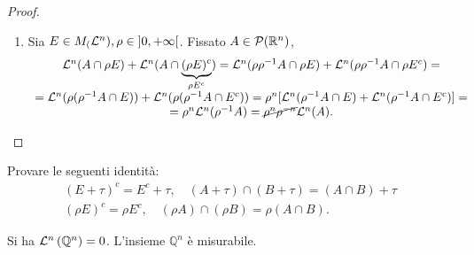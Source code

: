 \begin{proof}
\begin{enumerate}[label=$(\arabic*)$]
\begin{enumerate}
          \item Sia $E\in M_(\mathcal{L}^n), \rho \in\;]0,+\infty[$. Fissato $A\in \mathcal{P}(\mathbb{R}^n)$, 
          \renewcommand{\arraystretch}{1.8}
          \[\begin{array}{c}
              \mathcal{L}^n(A\cap \rho E)+\mathcal{L}^n(A\cap \underbrace{(\rho E)^c}_{\rho E^c}) = \mathcal{L}^n(\rho\rho^{-1}A \cap \rho E)+\mathcal{L}^n(\rho \rho^{-1}A \cap \rho E^c)=\\
              = \mathcal{L}^n (\rho(\rho^{-1}A \cap E))+\mathcal{L}^n(\rho(\rho^{-1}A\cap E^c)) = \rho^n[\mathcal{L}^n(\rho^{-1}A\cap E)+\mathcal{L}^n(\rho^{-1}A\cap E^c)]=\\=\rho^n\mathcal{L}^n(\rho^{-1}A)=\cancel{\rho^n\rho^{-n}}\mathcal{L}^n(A).
          \end{array}\]\qedhere
          \renewcommand{\arraystretch}{1}
      \end{enumerate}
  \end{enumerate}
\end{proof}

\begin{exc} Provare le seguenti identità:
  \[
  \begin{gathered}
  (E+\tau)^{c}=E^{c}+\tau, \quad(A+\tau) \cap(B+\tau)=(A \cap B)+\tau \\
  (\rho E)^{c}=\rho E^{c}, \quad(\rho A) \cap(\rho B)=\rho(A \cap B) .
  \end{gathered}
  \]
\end{exc}

\begin{example}Si ha $\mathcal{L}^{n}\left(\mathbb{Q}^{n}\right)=0$. L'insieme $\mathbb{Q}^{n}$ è misurabile.
\end{example}

